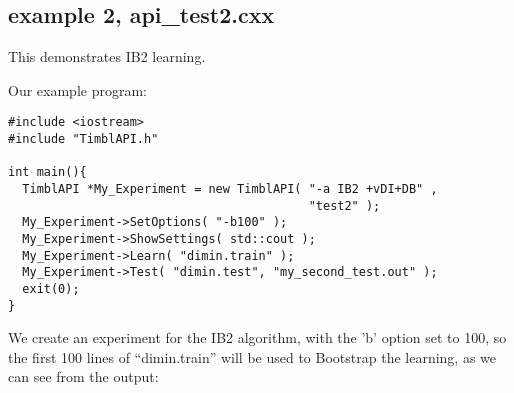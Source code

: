 \documentclass{article}
\begin{document}
\subsection{example 2, api\_test2.cxx}
This demonstrates IB2 learning.

Our example program:

\begin{verbatim}
#include <iostream>
#include "TimblAPI.h"

int main(){
  TimblAPI *My_Experiment = new TimblAPI( "-a IB2 +vDI+DB" , 
                                          "test2" );
  My_Experiment->SetOptions( "-b100" );
  My_Experiment->ShowSettings( std::cout );
  My_Experiment->Learn( "dimin.train" );  
  My_Experiment->Test( "dimin.test", "my_second_test.out" );  
  exit(0);
}
\end{verbatim}

We create an experiment for the IB2 algorithm, with the 'b' option set
to 100, so the first 100 lines of ``dimin.train'' will be used to
Bootstrap the learning, as we can see from the output:
\end{document}
